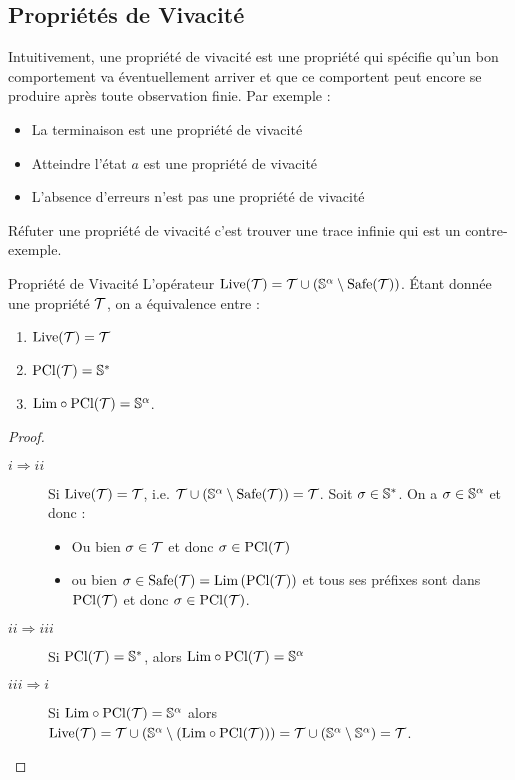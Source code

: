 \documentclass{cours}
\begin{document}
\subsection{Propriétés de Vivacité}
Intuitivement, une propriété de vivacité est une propriété qui spécifie qu'un bon comportement va éventuellement arriver et que ce comportent peut encore se produire après toute observation finie. Par exemple : 
\begin{itemize}
    \item La terminaison est une propriété de vivacité
    \item Atteindre l'état $a$ est une propriété de vivacité
    \item L'absence d'erreurs n'est pas une propriété de vivacité
\end{itemize}
Réfuter une propriété de vivacité c'est trouver une trace infinie qui est un contre-exemple.
\begin{définition}{Propriété de Vivacité}{}
    L'opérateur $\mathrm{Live}(\mT) = \mT \cup \left(\S^{\alpha} \setminus \mathrm{Safe}(\mT)\right)$. Étant donnée une propriété $\mT$, on a équivalence entre : 
    \begin{enumerate}
        \item $\mathrm{Live}(\mT) = \mT$
        \item $\mathrm{PCl}(\mT) = \S^{*}$
        \item $\rm Lim \circ PCl(\mT) = \S^{\alpha}$.
    \end{enumerate}
\end{définition}
\begin{proof}
    \begin{description}
        \item[$i \Rightarrow ii$] Si $\rm Live(\mT) = \mT$, i.e. $\mT \cup \left(\S^{\alpha} \setminus \rm Safe(\mT)\right) = \mT$. Soit $\sigma \in \S^{*}$. On a $\sigma \in \S^{\alpha}$ et donc : 
        \begin{itemize}
            \item Ou bien $\sigma \in \mT$ et donc $\sigma \in \rm PCl(\mT)$
            \item ou bien $\sigma \in \rm Safe(\mT) = Lim\left(PCl(\mT)\right)$ et tous ses préfixes sont dans $\rm PCl(\mT)$ et donc $\sigma \in \rm PCl(\mT)$. 
        \end{itemize}
        \item[$ii \Rightarrow iii$] Si $\rm PCl(\mT) = \S^{*}$, alors $\rm Lim \circ PCl(\mT) = \S^{\alpha}$
        \item[$iii \Rightarrow i$] Si $\rm Lim \circ PCl(\mT) = \S^{\alpha}$ alors $\rm Live(\mT) = \mT \cup \left(\S^{\alpha} \setminus \left(\rm Lim \circ PCl(\mT)\right)\right) = \mT \cup \left(\S^{\alpha} \setminus \S^{\alpha}\right) = \mT$.
    \end{description}
\end{proof}
\end{document}
